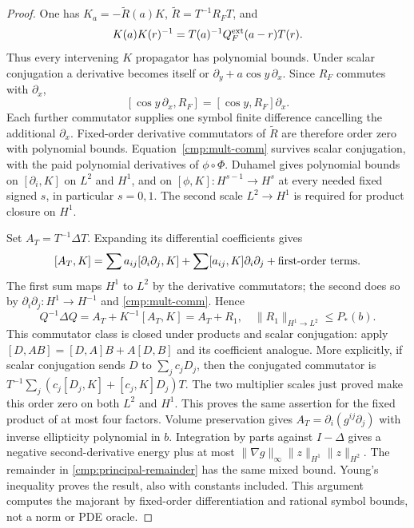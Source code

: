 \documentclass[11pt,a4paper]{amsart}
\theoremstyle{definition}
\theoremstyle{remark}
\numberwithin{equation}{section}
\begin{document}
\begin{proof}
One has $K_a=-\widetilde R(a)K$, $\widetilde R=T^{-1}R_FT$, and
\[
 K(a)K(r)^{-1}=T(a)^{-1}Q_F^{\rm ext}(a-r)T(r).
\]
Thus every intervening $K$ propagator has polynomial bounds. Under scalar
conjugation a derivative becomes itself or
$\partial_y+a\cos y\,\partial_x$. Since $R_F$ commutes with $\partial_x$,
\[
 [\cos y\,\partial_x,R_F]=[\cos y,R_F]\partial_x.
\]
Each further commutator supplies one symbol finite difference cancelling
the additional $\partial_x$. Fixed-order derivative commutators of
$\widetilde R$ are therefore order zero with polynomial bounds.
Equation~\eqref{cmp:mult-comm} survives scalar conjugation, with the paid
polynomial derivatives of $\phi\circ\Phi$. Duhamel gives polynomial bounds
on $[\partial_i,K]$ on $L^2$ and $H^1$, and on
$[\phi,K]:H^{s-1}\to H^s$ at every needed fixed signed $s$, in particular $s=0,1$. The second scale $L^2\to H^1$ is required for product closure on $H^1$.

Set $A_T=T^{-1}\Delta T$. Expanding its differential coefficients gives
\[
 [A_T,K]=\sum a_{ij}[\partial_i\partial_j,K]
       +\sum[a_{ij},K]\partial_i\partial_j+
                              \hbox{first-order terms}.
\]
The first sum maps $H^1$ to $L^2$ by the derivative commutators; the second
does so by $\partial_i\partial_j:H^1\to H^{-1}$ and
\eqref{cmp:mult-comm}. Hence
\begin{equation}
 Q^{-1}\Delta Q=A_T+K^{-1}[A_T,K]=A_T+R_1,
 \quad \|R_1\|_{H^1\to L^2}\le P_*(b).
 \label{cmp:principal-remainder}
\end{equation}
This commutator class is closed under products and scalar conjugation:
apply $[D,AB]=[D,A]B+A[D,B]$ and its coefficient analogue. More explicitly, if scalar conjugation sends $D$ to $\sum_jc_jD_j$, then the conjugated commutator is $T^{-1}\sum_j(c_j[D_j,K]+[c_j,K]D_j)T$. The two multiplier scales just proved make this order zero on both $L^2$ and $H^1$. This proves the
same assertion for the fixed product of at most four factors.
Volume preservation gives $A_T=\partial_i(g^{ij}\partial_j)$ with inverse
ellipticity polynomial in $b$. Integration by parts against $I-\Delta$
gives a negative second-derivative energy plus at most
$\|\nabla g\|_\infty\|z\|_{H^1}\|z\|_{H^2}$.
The remainder in \eqref{cmp:principal-remainder} has the same mixed bound.
Young's inequality proves the result, also with constants included.
This argument computes the majorant by fixed-order differentiation and
rational symbol bounds, not a norm or PDE oracle.
\end{proof}
\end{document}
